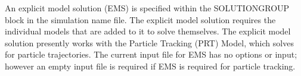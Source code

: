 An explicit model solution (EMS) is specified within the SOLUTIONGROUP block in the simulation name file.  The explicit model solution requires the individual models that are added to it to solve themselves.  The explicit model solution presently works with the Particle Tracking (PRT) Model, which solves for particle trajectories.  The current input file for EMS has no options or input; however an empty input file is required if EMS is required for particle tracking.